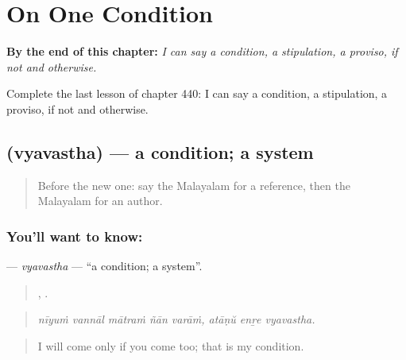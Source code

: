 
\chapter{On One Condition}
\label{ch:ml-on-one-condition}

\begin{chapteropening}
\textbf{By the end of this chapter:} \emph{I can say a condition, a stipulation, a proviso, if not and otherwise.}

Complete the last lesson of chapter 440: I can say a condition, a stipulation, a proviso, if not and otherwise.
\end{chapteropening}

\section[\texorpdfstring{\ml{വ്യവസ്ഥ} (vyavastha)}{വ്യവസ്ഥ (vyavastha)}]{ (vyavastha) — a condition; a system}

\label{lesson:ML-C440-vyavastha}



\begin{quote}
Before the new one: say the Malayalam for a reference, then the Malayalam for an author.
\end{quote}

\subsection*{You'll want to know: }
\textbf{} — \emph{vyavastha} — \textquotedblleft{}a condition; a system\textquotedblright{}.

\begin{quote}
    ,   .
\end{quote}

\begin{quote}
\emph{nīyuṁ vannāl mātraṁ ñān varāṁ, atāṇŭ enṟe vyavastha.}
\end{quote}

\begin{quote}
I will come only if you come too; that is my condition.
\end{quote}

